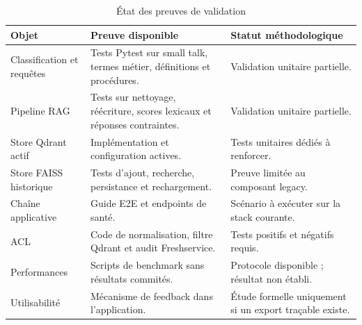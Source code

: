 \begin{table}[H]
\centering
\caption{État des preuves de validation}
\label{tab:preuves_validation}
\begin{tabular}{p{3.3cm}p{5.8cm}p{4.2cm}}
\toprule
\textbf{Objet} & \textbf{Preuve disponible} & \textbf{Statut méthodologique} \\
\midrule
Classification et requêtes & Tests Pytest sur small talk, termes métier, définitions et procédures. & Validation unitaire partielle. \\
Pipeline RAG & Tests sur nettoyage, réécriture, scores lexicaux et réponses contraintes. & Validation unitaire partielle. \\
Store Qdrant actif & Implémentation et configuration actives. & Tests unitaires dédiés à renforcer. \\
Store FAISS historique & Tests d'ajout, recherche, persistance et rechargement. & Preuve limitée au composant legacy. \\
Chaîne applicative & Guide E2E et endpoints de santé. & Scénario à exécuter sur la stack courante. \\
ACL & Code de normalisation, filtre Qdrant et audit Freshservice. & Tests positifs et négatifs requis. \\
Performances & Scripts de benchmark sans résultats commités. & Protocole disponible ; résultat non établi. \\
Utilisabilité & Mécanisme de feedback dans l'application. & Étude formelle uniquement si un export traçable existe. \\
\bottomrule
\end{tabular}
\end{table}
